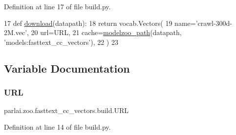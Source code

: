 Definition at line 17 of file build.\+py.


\begin{DoxyCode}
17 \textcolor{keyword}{def }\hyperlink{namespaceparlai_1_1zoo_1_1pretrained__transformers_1_1build_afaead0deab400e1c516706e85dd4ed9b}{download}(datapath):
18     \textcolor{keywordflow}{return} vocab.Vectors(
19         name=\textcolor{stringliteral}{'crawl-300d-2M.vec'},
20         url=URL,
21         cache=\hyperlink{namespaceparlai_1_1agents_1_1legacy__agents_1_1seq2seq_1_1utils__v0_a5fbd3301b67f00d6d146fb01c7cd7626}{modelzoo\_path}(datapath, \textcolor{stringliteral}{'models:fasttext\_cc\_vectors'}),
22     )
23 \end{DoxyCode}


\subsection{Variable Documentation}
\mbox{\label{namespaceparlai_1_1zoo_1_1fasttext__cc__vectors_1_1build_a3bb00344b826f64a6617c8563f1f13f1}} 
\subsubsection{\texorpdfstring{U\+RL}{URL}}
{\footnotesize\ttfamily parlai.\+zoo.\+fasttext\+\_\+cc\+\_\+vectors.\+build.\+U\+RL}



Definition at line 14 of file build.\+py.

